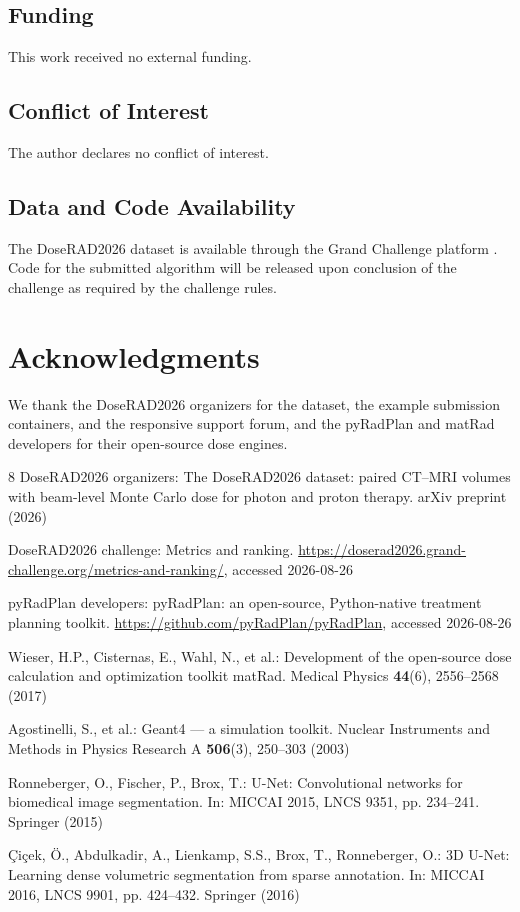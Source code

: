 \documentclass[runningheads]{llncs}
\begin{document}
\subsection*{Funding}
This work received no external funding.

\subsection*{Conflict of Interest}
The author declares no conflict of interest.

\subsection*{Data and Code Availability}
The DoseRAD2026 dataset is available through the Grand Challenge platform \cite{doserad_data}. Code for the submitted algorithm will be released upon conclusion of the challenge as required by the challenge rules.

\section*{Acknowledgments}
We thank the DoseRAD2026 organizers for the dataset, the example submission containers, and the responsive support forum, and the pyRadPlan and matRad developers for their open-source dose engines.

\begin{thebibliography}{8}
DoseRAD2026 organizers: The DoseRAD2026 dataset: paired CT--MRI volumes with beam-level Monte Carlo dose for photon and proton therapy. arXiv preprint  (2026)

DoseRAD2026 challenge: Metrics and ranking. \url{https://doserad2026.grand-challenge.org/metrics-and-ranking/}, accessed 2026-08-26

pyRadPlan developers: pyRadPlan: an open-source, Python-native treatment planning toolkit. \url{https://github.com/pyRadPlan/pyRadPlan}, accessed 2026-08-26

Wieser, H.P., Cisternas, E., Wahl, N., et al.: Development of the open-source dose calculation and optimization toolkit matRad. Medical Physics \textbf{44}(6), 2556--2568 (2017)

Agostinelli, S., et al.: Geant4 --- a simulation toolkit. Nuclear Instruments and Methods in Physics Research A \textbf{506}(3), 250--303 (2003)

Ronneberger, O., Fischer, P., Brox, T.: U-Net: Convolutional networks for biomedical image segmentation. In: MICCAI 2015, LNCS 9351, pp. 234--241. Springer (2015)

\c{C}i\c{c}ek, \"O., Abdulkadir, A., Lienkamp, S.S., Brox, T., Ronneberger, O.: 3D U-Net: Learning dense volumetric segmentation from sparse annotation. In: MICCAI 2016, LNCS 9901, pp. 424--432. Springer (2016)
\end{thebibliography}
\end{document}
